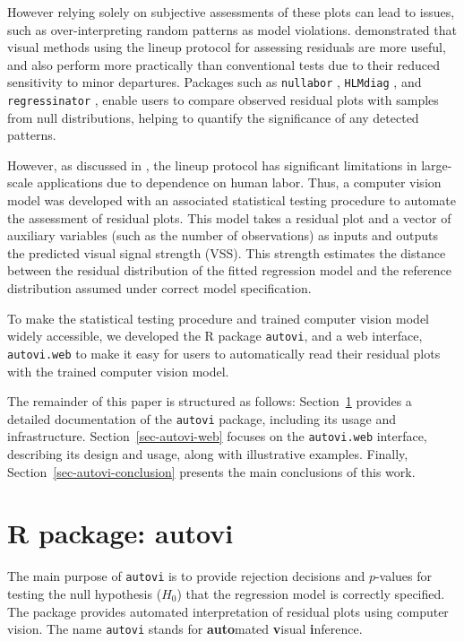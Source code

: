 \documentclass[
doublespace,
  times]{anzsauth}
\begin{document}
However relying solely on subjective assessments of these plots can lead
to issues, such as over-interpreting random patterns as model
violations. \citet{li2024plot} demonstrated that visual methods using
the lineup protocol \citep{buja2009statistical} for assessing residuals
are more useful, and also perform more practically than conventional
tests due to their reduced sensitivity to minor departures. Packages
such as \texttt{nullabor} \citep{nullabor}, \texttt{HLMdiag}
\citep{loy2014hlmdiag}, and \texttt{regressinator}
\citep{regressinator}, enable users to compare observed residual plots
with samples from null distributions, helping to quantify the
significance of any detected patterns.

However, as discussed in \citet{li2024automated}, the lineup protocol
has significant limitations in large-scale applications due to
dependence on human labor. Thus, a computer vision model was developed
with an associated statistical testing procedure to automate the
assessment of residual plots. This model takes a residual plot and a
vector of auxiliary variables (such as the number of observations) as
inputs and outputs the predicted visual signal strength (VSS). This
strength estimates the distance between the residual distribution of the
fitted regression model and the reference distribution assumed under
correct model specification.

To make the statistical testing procedure and trained computer vision
model widely accessible, we developed the R package \texttt{autovi}, and
a web interface, \texttt{autovi.web} to make it easy for users to
automatically read their residual plots with the trained computer vision
model.

The remainder of this paper is structured as follows:
Section~\ref{sec-autovi} provides a detailed documentation of the
\texttt{autovi} package, including its usage and infrastructure.
Section~\ref{sec-autovi-web} focuses on the \texttt{autovi.web}
interface, describing its design and usage, along with illustrative
examples. Finally, Section~\ref{sec-autovi-conclusion} presents the main
conclusions of this work.

\section{R package: autovi}\label{sec-autovi}

The main purpose of \texttt{autovi} is to provide rejection decisions
and \(p\)-values for testing the null hypothesis (\(H_0\)) that the
regression model is correctly specified. The package provides automated
interpretation of residual plots using computer vision. The name
\texttt{autovi} stands for \textbf{auto}mated \textbf{v}isual
\textbf{i}nference.
\end{document}
